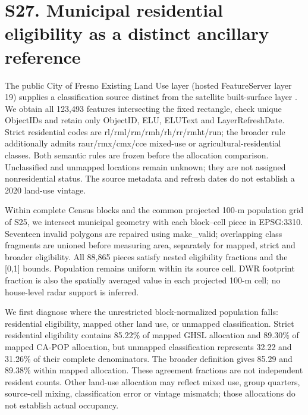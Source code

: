 \documentclass[10pt,a4paper]{article}
\begin{document}
\section*{S27. Municipal residential eligibility as a distinct ancillary reference}
The public City of Fresno Existing Land Use layer (hosted FeatureServer layer 19) supplies a classification source distinct from the satellite built-surface layer \citep{fresno2026landuse}. We obtain all 123,493 features intersecting the fixed rectangle, check unique ObjectIDs and retain only ObjectID, ELU, ELUText and LayerRefreshDate. Strict residential codes are rl/rml/rm/rmh/rh/rr/rmht/run; the broader rule additionally admits raur/rmx/cmx/cce mixed-use or agricultural-residential classes. Both semantic rules are frozen before the allocation comparison. Unclassified and unmapped locations remain unknown; they are not assigned nonresidential status. The source metadata and refresh dates do not establish a 2020 land-use vintage.

Within complete Census blocks and the common projected 100-m population grid of S25, we intersect municipal geometry with each block--cell piece in EPSG:3310. Seventeen invalid polygons are repaired using make\_valid; overlapping class fragments are unioned before measuring area, separately for mapped, strict and broader eligibility. All 88,865 pieces satisfy nested eligibility fractions and the [0,1] bounds. Population remains uniform within its source cell. DWR footprint fraction is also the spatially averaged value in each projected 100-m cell; no house-level radar support is inferred.

We first diagnose where the unrestricted block-normalized population falls: residential eligibility, mapped other land use, or unmapped classification. Strict residential eligibility contains 85.22\% of mapped GHSL allocation and 89.30\% of mapped CA-POP allocation, but unmapped classification represents 32.22 and 31.26\% of their complete denominators. The broader definition gives 85.29 and 89.38\% within mapped allocation. These agreement fractions are not independent resident counts. Other land-use allocation may reflect mixed use, group quarters, source-cell mixing, classification error or vintage mismatch; those allocations do not establish actual occupancy.
\end{document}

